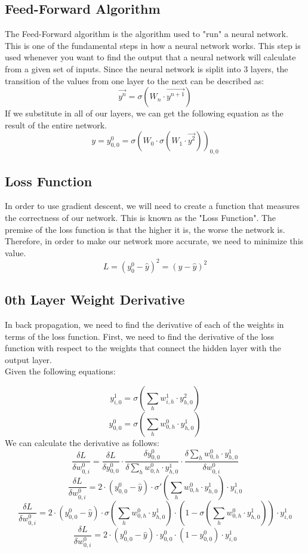 \documentclass[10pt]{article}
\begin{document}
\subsection{Feed-Forward Algorithm}
The Feed-Forward algorithm is the algorithm used to "run" a neural network. This is one of the fundamental steps in how a neural network works. This step is used whenever you want to find the output that a neural network will calculate from a given set of inputs. Since the neural network is siplit into 3 layers, the transition of the values from one layer to the next can be described as:
$$\vec{y^n} = \sigma(W_{n} \cdot \vec{y^{n+1}})$$
If we substitute in all of our layers, we can get the following equation as the result of the entire network.
$$y = y^0_{0,0} = \sigma(W_0 \cdot \sigma(W_1 \cdot \vec{y^2}))_{0,0}$$
\subsection{Loss Function}
In order to use gradient descent, we will need to create a function that measures the correctness of our network. This is known as the "Loss Function". The premise of the loss function is that the higher it is, the worse the network is. Therefore, in order to make our network more accurate, we need to minimize this value.
$$L = (y^0_0 - \hat{y})^2 = (y - \hat{y})^2$$

\subsection{0th Layer Weight Derivative}

In back propagation, we need to find the derivative of each of the weights in terms of the loss function. First, we need to find the derivative of the loss function with respect to the weights that connect the hidden layer with the output layer.\\
Given the following equations:

$$y^1_{i,0} = \sigma(\sum_h{w^1_{i,h} \cdot y^2_{h,0}})$$
$$y^0_{0,0} = \sigma(\sum_h{w^0_{0,h} \cdot y^1_{h,0}})$$
We can calculate the derivative as follows:
$$\frac{\delta L}{\delta w^0_{0,i}} = \frac{\delta L}{\delta y^0_{0,0}} \cdot \frac{\delta y^0_{0,0}}{\delta \sum_h{w^0_{0,h} \cdot y^1_{h,0}}} \cdot \frac{\delta \sum_h{w^0_{0,h} \cdot y^1_{h,0}}}{\delta w^0_{0,i}}$$
$$\frac{\delta L}{\delta w^0_{0,i}} = 2 \cdot (y^0_{0,0} - \hat{y}) \cdot \sigma'(\sum_h{w^0_{0,h} \cdot y^1_{h,0}}) \cdot y^1_{i,0}$$
$$\frac{\delta L}{\delta w^0_{0,i}} = 2 \cdot (y^0_{0,0} - \hat{y}) \cdot \sigma(\sum_h{w^0_{0,h} \cdot y^1_{h,0}}) \cdot (1 - \sigma(\sum_h{w^0_{0,h} \cdot y^1_{h,0}})) \cdot y^1_{i,0}$$
$$\frac{\delta L}{\delta w^0_{0,i}} = 2\cdot (y^0_{0,0} - \hat{y}) \cdot y^0_{0,0} \cdot (1 - y^0_{0,0}) \cdot y^1_{i,0}$$
\end{document}
